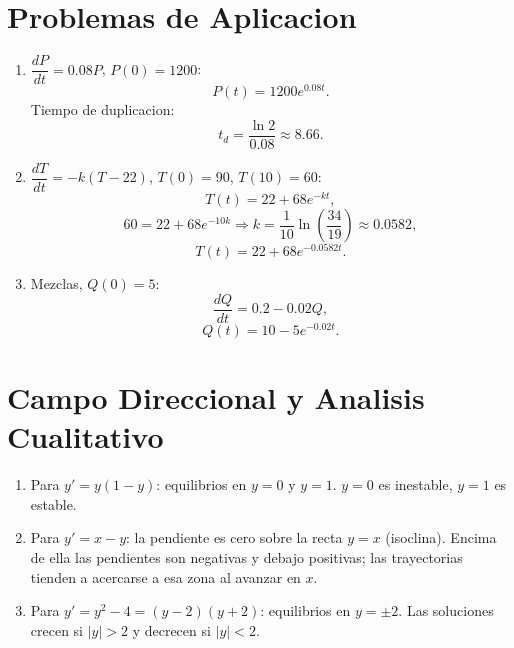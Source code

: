 \documentclass[12pt,a4paper]{article}
\begin{document}
\section{Problemas de Aplicacion}
\begin{enumerate}
    \item $\dfrac{dP}{dt}=0.08P$, $P(0)=1200$:
    $$P(t)=1200e^{0.08t}.$$
    Tiempo de duplicacion:
    $$t_d=\frac{\ln 2}{0.08}\approx 8.66.$$

    \item $\dfrac{dT}{dt}=-k(T-22)$, $T(0)=90$, $T(10)=60$:
    $$T(t)=22+68e^{-kt},$$
    $$60=22+68e^{-10k}\Rightarrow k=\frac{1}{10}\ln\left(\frac{34}{19}\right)\approx 0.0582,$$
    $$T(t)=22+68e^{-0.0582t}.$$

    \item Mezclas, $Q(0)=5$:
    $$\frac{dQ}{dt}=0.2-0.02Q,$$
    $$Q(t)=10-5e^{-0.02t}.$$
\end{enumerate}

\section{Campo Direccional y Analisis Cualitativo}
\begin{enumerate}
    \item Para $y'=y(1-y)$: equilibrios en $y=0$ y $y=1$. $y=0$ es inestable, $y=1$ es estable.

    \item Para $y'=x-y$: la pendiente es cero sobre la recta $y=x$ (isoclina). Encima de ella las pendientes son negativas y debajo positivas; las trayectorias tienden a acercarse a esa zona al avanzar en $x$.

    \item Para $y'=y^2-4=(y-2)(y+2)$: equilibrios en $y=\pm2$. Las soluciones crecen si $|y|>2$ y decrecen si $|y|<2$.
\end{enumerate}
\end{document}
